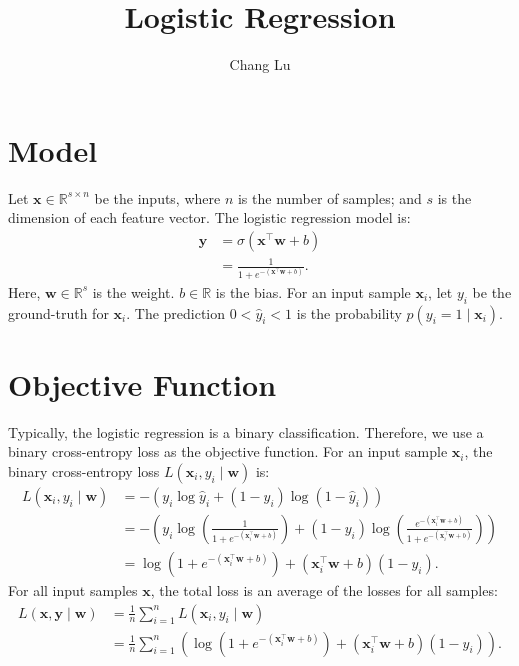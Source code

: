 \documentclass{article}
\title{Logistic Regression}
\author{Chang Lu}
\begin{document}
\maketitle

\section{Model}
Let $\mathbf{x} \in \mathbb{R}^{s \times n}$ be the inputs, where $n$ is the number of samples; and $s$ is the dimension of each feature vector. The logistic regression model is:
\begin{align}
    \hat{\mathbf{y}} &= \sigma\left(\mathbf{x}^\top\mathbf{w} + b\right) \\
    & = \frac{1}{1 + e^{-\left(\mathbf{x^\top w} + b\right)}}.
\end{align}
Here, $\mathbf{w} \in \mathbb{R}^s$ is the weight. $b \in \mathbb{R}$ is the bias. For an input sample $\mathbf{x}_i$, let $y_i$ be the ground-truth for $\mathbf{x}_i$. The prediction $0 < \hat{{y}}_i < 1$ is the probability $p\left(y_i = 1 \mid \mathbf{x}_i\right)$.

\section{Objective Function}
Typically, the logistic regression is a binary classification. Therefore, we use a binary cross-entropy loss as the objective function. For an input sample $\mathbf{x}_i$, the binary cross-entropy loss $L(\mathbf{x}_i, y_i \mid \mathbf{w})$ is:
\begin{align}
    L(\mathbf{x}_i, y_i \mid \mathbf{w}) &= -\left(y_i \log\hat{y}_i + \left(1 - y_i\right)\log\left(1 - \hat{y}_i\right)\right) \\
    &= -\left(y_i \log\left(\frac{1}{1 + e^{-\left(\mathbf{x}^\top_i\mathbf{w} + b\right)}}\right) + \left(1 - y_i\right)\log\left(\frac{e^{-\left(\mathbf{x}^\top_i\mathbf{w} + b\right)}}{1 + e^{-\left(\mathbf{x}^\top_i\mathbf{w} + b\right)}}\right)\right) \\
    &= \log\left(1 + e^{-\left(\mathbf{x}^\top_i\mathbf{w} + b\right)}\right) + \left(\mathbf{x}^\top_i\mathbf{w} + b\right)\left(1 - y_i\right).
\end{align}
For all input samples $\mathbf{x}$, the total loss is an average of the losses for all samples:
\begin{align}
    L(\mathbf{x}, \mathbf{y} \mid \mathbf{w}) &= \frac{1}{n}\sum_{i = 1}^{n}{L(\mathbf{x}_i, y_i \mid \mathbf{w})} \\
    &= \frac{1}{n}\sum_{i = 1}^{n}{\left(\log\left(1 + e^{-\left(\mathbf{x}^\top_i\mathbf{w} + b\right)}\right) + \left(\mathbf{x}^\top_i\mathbf{w} + b\right)\left(1 - y_i\right)\right)}.
\end{align}
\end{document}
